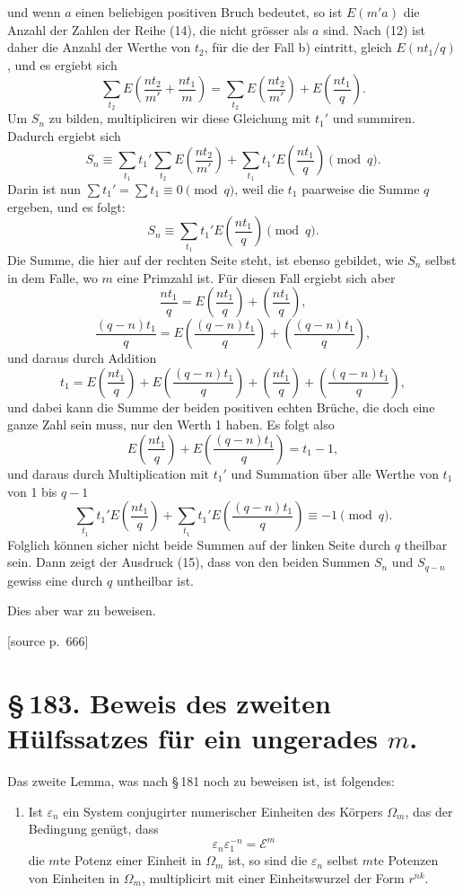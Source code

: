 \documentclass[11pt]{article}
\newcommand{\srcpage}[1]{\par\medskip\noindent\textsf{[source p.~#1]}\par\smallskip}
\begin{document}
und wenn $a$ einen beliebigen positiven Bruch bedeutet, so ist $E(m'a)$ die Anzahl der Zahlen der Reihe (14), die nicht grösser als $a$ sind. Nach (12) ist daher die Anzahl der Werthe von $t_2$, für die der Fall b) eintritt, gleich $E(nt_1/q)$, und es ergiebt sich
\[
\sum_{t_2}E\left(\frac{nt_2}{m'}+\frac{nt_1}{m}\right)
=
\sum_{t_2}E\left(\frac{nt_2}{m'}\right)+E\left(\frac{nt_1}{q}\right).
\]
Um $S_n$ zu bilden, multipliciren wir diese Gleichung mit $t_1'$ und summiren. Dadurch ergiebt sich
\[
S_n\equiv \sum_{t_1}t_1'\sum_{t_2}E\left(\frac{nt_2}{m'}\right)+\sum_{t_1}t_1'E\left(\frac{nt_1}{q}\right)\pmod q.
\]
Darin ist nun $\sum t_1'=\sum t_1\equiv0\pmod q$, weil die $t_1$ paarweise die Summe $q$ ergeben, und es folgt:
\begin{equation}
S_n\equiv\sum_{t_1}t_1'E\left(\frac{nt_1}{q}\right)\pmod q.
\tag{15}
\end{equation}
Die Summe, die hier auf der rechten Seite steht, ist ebenso gebildet, wie $S_n$ selbst in dem Falle, wo $m$ eine Primzahl ist. Für diesen Fall ergiebt sich aber
\[
\frac{nt_1}{q}=E\left(\frac{nt_1}{q}\right)+\left(\frac{nt_1}{q}\right),
\]
\[
\frac{(q-n)t_1}{q}=E\left(\frac{(q-n)t_1}{q}\right)+\left(\frac{(q-n)t_1}{q}\right),
\]
und daraus durch Addition
\[
t_1=E\left(\frac{nt_1}{q}\right)+E\left(\frac{(q-n)t_1}{q}\right)+\left(\frac{nt_1}{q}\right)+\left(\frac{(q-n)t_1}{q}\right),
\]
und dabei kann die Summe der beiden positiven echten Brüche, die doch eine ganze Zahl sein muss, nur den Werth 1 haben. Es folgt also
\[
E\left(\frac{nt_1}{q}\right)+E\left(\frac{(q-n)t_1}{q}\right)=t_1-1,
\]
und daraus durch Multiplication mit $t_1'$ und Summation über alle Werthe von $t_1$ von 1 bis $q-1$
\[
\sum_{t_1}t_1'E\left(\frac{nt_1}{q}\right)+\sum_{t_1}t_1'E\left(\frac{(q-n)t_1}{q}\right)\equiv -1\pmod q.
\]
Folglich können sicher nicht beide Summen auf der linken Seite durch $q$ theilbar sein. Dann zeigt der Ausdruck (15), dass von den beiden Summen $S_n$ und $S_{q-n}$ gewiss eine durch $q$ untheilbar ist.

Dies aber war zu beweisen.

\srcpage{666}
\section*{\S\,183. Beweis des zweiten Hülfssatzes für ein ungerades $m$.}

Das zweite Lemma, was nach \S\,181 noch zu beweisen ist, ist folgendes:

\begin{enumerate}[label=\arabic*.,leftmargin=2.2em,start=2]
\item Ist $\varepsilon_n$ ein System conjugirter numerischer Einheiten des Körpers $\Omega_m$, das der Bedingung genügt, dass
\begin{equation}
\varepsilon_n\varepsilon_1^{-n}=\mathscr E^m
\tag{1}
\end{equation}
die $m$te Potenz einer Einheit in $\Omega_m$ ist, so sind die $\varepsilon_n$ selbst $m$te Potenzen von Einheiten in $\Omega_m$, multiplicirt mit einer Einheitswurzel der Form $r^{nk}$.
\end{enumerate}
\end{document}
